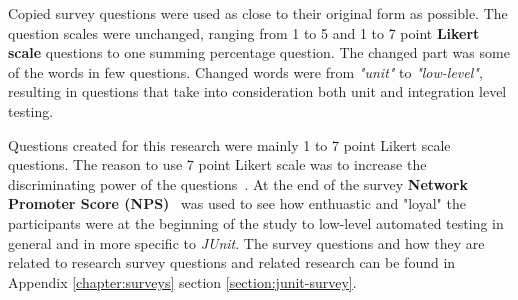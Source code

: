     Copied survey questions were used as close to their original form as possible.
    The question scales were unchanged, ranging from 1 to 5 and 1 to 7 point \textbf{Likert scale} questions
    to one summing percentage question. The changed part was some of the words in few questions.
    Changed words were from \textit{"unit"} to \textit{"low-level"},
    resulting in questions that take into consideration both unit and integration level testing.

    Questions created for this research were mainly 1 to 7 point Likert scale questions.
    The reason to use 7 point Likert scale was to increase the discriminating power of the questions~\cite{cummins2000we}.
    At the end of the survey \textbf{Network Promoter Score (NPS)}~\cite{reichheld2003one} was used to see how enthuastic and "loyal" the participants
    were at the beginning of the study to low-level automated testing in general and in more specific to \textit{JUnit}.
    The survey questions and how they are related to research survey questions and related research can be found
    in Appendix \ref{chapter:surveys} section \ref{section:junit-survey}.

